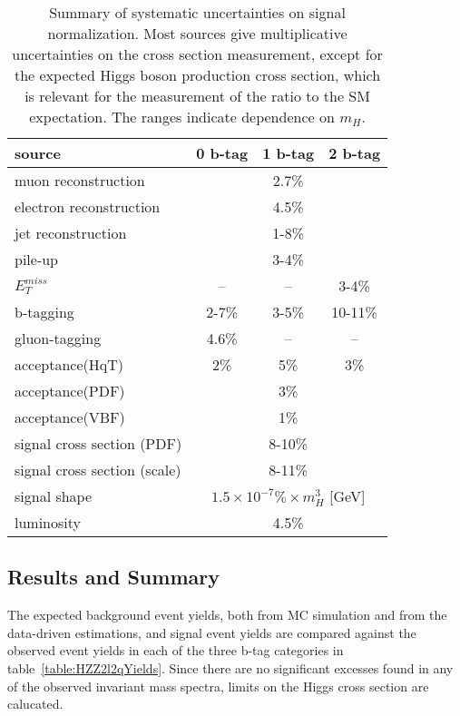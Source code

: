 \begin{table}
\begin{center}
\begin{tabular}{l|c|c|c}
\hline 
\hline

source & 0 b-tag & 1 b-tag & 2 b-tag \\ \hline \hline

muon reconstruction & \multicolumn{3}{c}{2.7\%} \\ \hline
electron reconstruction & \multicolumn{3}{c}{4.5\%} \\ \hline
jet reconstruction & \multicolumn{3}{c}{1-8\%} \\ \hline
pile-up & \multicolumn{3}{c}{3-4\%} \\ \hline
$E_T^{miss}$ & -- & -- & 3-4\% \\ \hline
b-tagging & 2-7\% & 3-5\% & 10-11\% \\ \hline
gluon-tagging & 4.6\% & -- & -- \\ \hline
acceptance(HqT) & 2\% & 5\% & 3\% \\ \hline
acceptance(PDF) & \multicolumn{3}{c}{3\%} \\ \hline
acceptance(VBF) & \multicolumn{3}{c}{1\%} \\ \hline
signal cross section (PDF) & \multicolumn{3}{c}{8-10\%} \\ \hline
signal cross section (scale) & \multicolumn{3}{c}{8-11\%} \\ \hline
signal shape    & \multicolumn{3}{c}{$1.5\times10^{-7}\%\times m_{H}^{3}$ [GeV]} \\ \hline
luminosity      & \multicolumn{3}{c}{4.5\%} \\ \hline \hline

\end{tabular}
\caption{Summary of systematic uncertainties on signal normalization.
Most sources give multiplicative uncertainties on the cross section
measurement, except for the expected Higgs boson production cross 
section, which is relevant for the measurement of the ratio to the 
SM expectation.  The ranges indicate dependence on $m_{H}$.}
\label{table:HZZ2l2qSystematics}
\end{center}
\end{table}

\subsection{Results and Summary}
\label{sec:HZZ2l2qxsec}

The expected background event yields, both from MC simulation and from the
data-driven estimations, and signal event yields are compared against
the observed event yields in each of the three b-tag categories in 
table~\ref{table:HZZ2l2qYields}.
Since there are no significant excesses found in any of the observed 
invariant mass spectra, limits on the Higgs cross section are calucated.

